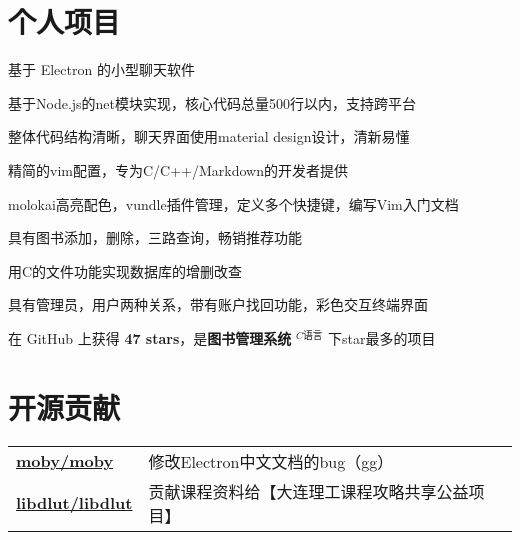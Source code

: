 \documentclass[]{deedy-resume-openfont}
\begin{document}
\begin{minipage}[t]{0.73\textwidth}
\section{个人项目}
\sectionsep
{}
\begin{tightemize}
    \item 基于 Electron 的小型聊天软件
    \item 基于Node.js的net模块实现，核心代码总量500行以内，支持跨平台
    \item 整体代码结构清晰，聊天界面使用material design设计，清新易懂
    \end{tightemize}
\sectionsep

\begin{tightemize}
    \item 精简的vim配置，专为C/C++/Markdown的开发者提供
    \item molokai高亮配色，vundle插件管理，定义多个快捷键，编写Vim入门文档
    \end{tightemize}
\sectionsep

\begin{tightemize}
    \item 具有图书添加，删除，三路查询，畅销推荐功能
    \item 用C的文件功能实现数据库的增删改查
    \item 具有管理员，用户两种关系，带有账户找回功能，彩色交互终端界面
    \item 在 GitHub 上获得 \textbf{47 stars}，是\textbf{图书管理系统} $^{C语言}$ 下star最多的项目
    \end{tightemize}
\sectionsep


\section{开源贡献}
\begin{tabular}{ll}
\href{https://github.com/electron/i18n/pull/728}{\bf moby/moby} & 修改Electron中文文档的bug（gg） \\
\href{https://github.com/fuujiro/libdlut/commits?author=fuujiro}{\bf libdlut/libdlut} & 贡献课程资料给【大连理工课程攻略共享公益项目】 \\
\end{tabular}
\sectionsep


\end{minipage}
\end{document}
